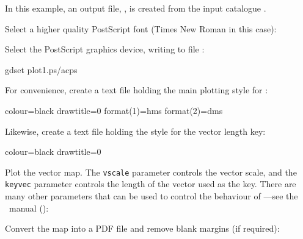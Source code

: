 In this example, an output file, , is created from the input
catalogue .

Select a higher quality PostScript font (Times New Roman in this case):

\begin{terminalv}
\end{terminalv}

Select the PostScript graphics device, writing to file :

\begin{terminalv}
gdset plot1.ps/acps
\end{terminalv}

For convenience, create a text file holding the main plotting style for
:

\begin{terminalv}
colour=black
drawtitle=0
format(1)=hms
format(2)=dms
\end{terminalv}

Likewise, create a text file holding the style for the vector length
key:

\begin{terminalv}
colour=black
drawtitle=0
\end{terminalv}


Plot the vector map. The \texttt{vscale} parameter controls the vector
scale, and the \texttt{keyvec} parameter controls the length of the
vector used as the key. There are many other parameters that can be
used to control the behaviour of ---see the \polpack\
manual ():

\begin{terminalv}
\end{terminalv}

Convert the map into a PDF file and remove blank margins (if required):

\begin{terminalv}
\end{terminalv}


